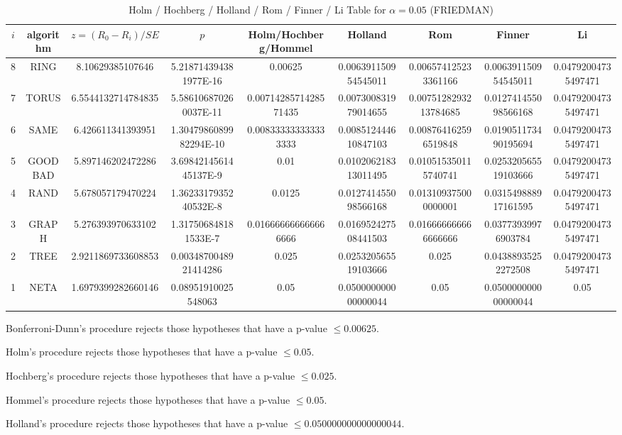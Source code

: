 \documentclass[a4paper,10pt]{article}
\begin{document}
\begin{landscape}
\begin{table}[!htp]
\begin{tabular}{
|r|r|r|r|r|r|r|r|r|r|}
\end{tabular}
\end{table}

\newpage

\begin{table}[!htp]
\centering\scriptsize
\caption{Holm / Hochberg / Holland / Rom / Finner / Li Table for $\alpha=0.05$ (FRIEDMAN)}
\begin{tabular}{ccccccccc}
$i$&algorithm&$z=(R_0 - R_i)/SE$&$p$&Holm/Hochberg/Hommel&Holland&Rom&Finner&Li\\
\hline
8& RING&8.10629385107646&5.218714394381977E-16&0.00625&0.006391150954545011&0.006574125233361166&0.006391150954545011&0.04792004735497471\\
7& TORUS&6.5544132714784835&5.586106870260037E-11&0.0071428571428571435&0.007300831979014655&0.0075128293213784685&0.012741455098566168&0.04792004735497471\\
6& SAME&6.426611341393951&1.3047986089982294E-10&0.008333333333333333&0.008512444610847103&0.008764162596519848&0.019051173490195694&0.04792004735497471\\
5& GOODBAD&5.897146202472286&3.6984214561445137E-9&0.01&0.010206218313011495&0.010515350115740741&0.025320565519103666&0.04792004735497471\\
4& RAND&5.678057179470224&1.3623317935240532E-8&0.0125&0.012741455098566168&0.013109375000000001&0.031549888917161595&0.04792004735497471\\
3& GRAPH&5.276393970633102&1.317506848181533E-7&0.016666666666666666&0.016952427508441503&0.016666666666666666&0.03773939976903784&0.04792004735497471\\
2& TREE&2.9211869733608853&0.0034870048921414286&0.025&0.025320565519103666&0.025&0.04388935252272508&0.04792004735497471\\
1& NETA&1.6979399282660146&0.08951910025548063&0.05&0.050000000000000044&0.05&0.050000000000000044&0.05\\
\hline
\end{tabular}
\end{table}
Bonferroni-Dunn's procedure rejects those hypotheses that have a p-value $\le0.00625$.


Holm's procedure rejects those hypotheses that have a p-value $\le0.05$.


Hochberg's procedure rejects those hypotheses that have a p-value $\le0.025$.


Hommel's procedure rejects those hypotheses that have a p-value $\le0.05$.


Holland's procedure rejects those hypotheses that have a p-value $\le0.050000000000000044$.



\end{landscape}
\end{document}
